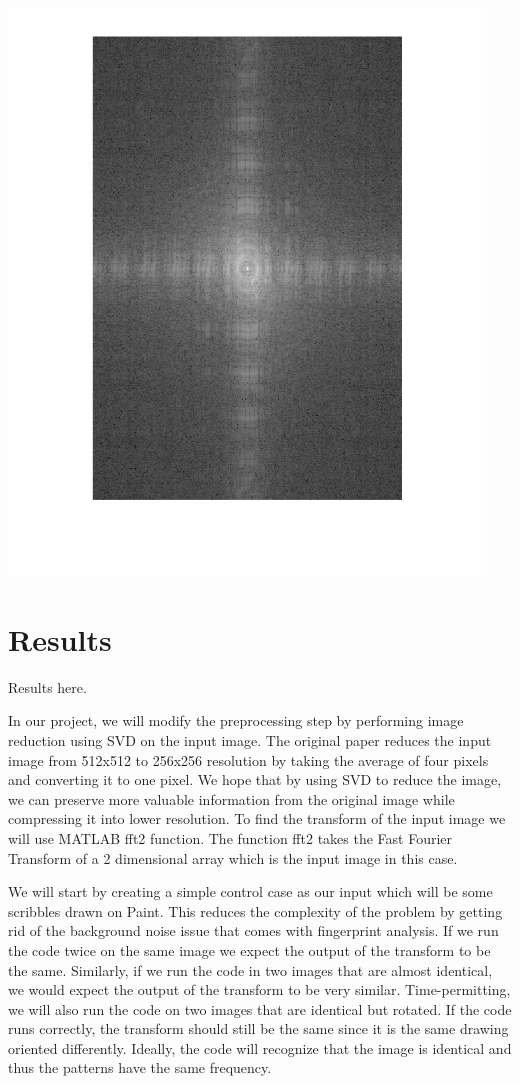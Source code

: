 \documentclass[letter]{amsart}
\begin{document}
\begin{minipage}[H]{0.33\textwidth}
    \centering
    \includegraphics[width=0.95\textwidth]{fingerprintLOOP_ft.jpg}
\end{minipage}


\section*{Results}
Results here.

In our project, we will modify the preprocessing step by performing image reduction using SVD on the input image. The original paper reduces the input image from 512x512 to 256x256 resolution by taking the average of four pixels and converting it to one pixel. We hope that by using SVD to reduce the image, we can preserve more valuable information from the original image while compressing it into lower resolution. To find the transform of the input image we will use MATLAB fft2 function. The function fft2 takes the Fast Fourier Transform of a 2 dimensional array which is the input image in this case.


We will start by creating a simple control case as our input which will be some scribbles drawn on Paint. This reduces the complexity of the problem by getting rid of the background noise issue that comes with fingerprint analysis. If we run the code twice on the same image we expect the output of the transform to be the same. Similarly, if we run the code in two images that are almost identical, we would expect the output of the transform to be very similar.
Time-permitting, we will also run the code on two images that are identical but rotated. If the code runs correctly, the transform should still be the same since it is the same drawing oriented differently. Ideally, the code will recognize that the image is identical and thus the patterns have the same frequency.
\end{document}

